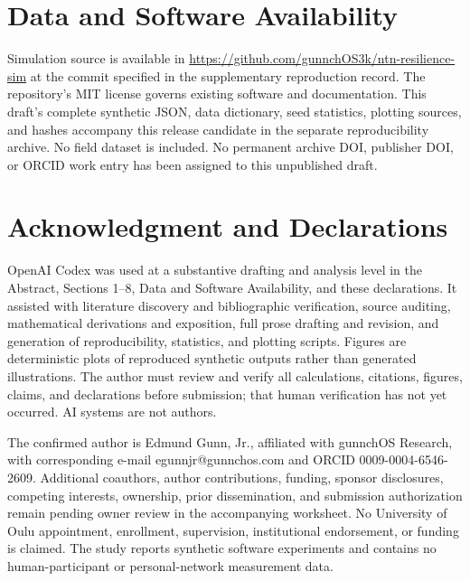 \documentclass[10pt,twocolumn]{article}
\begin{document}
\section*{Data and Software Availability}
Simulation source is available in \url{https://github.com/gunnchOS3k/ntn-resilience-sim} at the commit specified in the supplementary reproduction record. The repository's MIT license governs existing software and documentation. This draft's complete synthetic JSON, data dictionary, seed statistics, plotting sources, and hashes accompany this release candidate in the separate reproducibility archive. No field dataset is included. No permanent archive DOI, publisher DOI, or ORCID work entry has been assigned to this unpublished draft.

\section*{Acknowledgment and Declarations}
OpenAI Codex was used at a substantive drafting and analysis level in the Abstract, Sections 1--8, Data and Software Availability, and these declarations. It assisted with literature discovery and bibliographic verification, source auditing, mathematical derivations and exposition, full prose drafting and revision, and generation of reproducibility, statistics, and plotting scripts. Figures are deterministic plots of reproduced synthetic outputs rather than generated illustrations. The author must review and verify all calculations, citations, figures, claims, and declarations before submission; that human verification has not yet occurred. AI systems are not authors.

The confirmed author is Edmund Gunn, Jr., affiliated with gunnchOS Research, with corresponding e-mail egunnjr@gunnchos.com and ORCID 0009-0004-6546-2609. Additional coauthors, author contributions, funding, sponsor disclosures, competing interests, ownership, prior dissemination, and submission authorization remain pending owner review in the accompanying worksheet. No University of Oulu appointment, enrollment, supervision, institutional endorsement, or funding is claimed. The study reports synthetic software experiments and contains no human-participant or personal-network measurement data.



\end{document}
